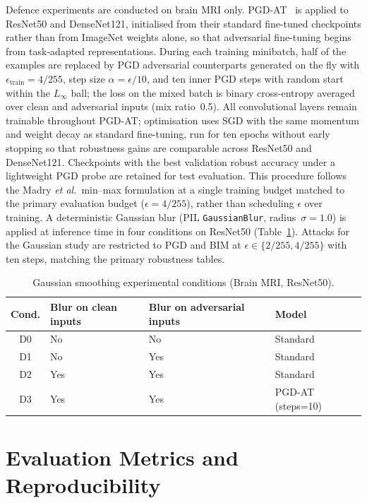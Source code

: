 \documentclass[12pt,a4paper,oneside]{report}
\begin{document}
Defence experiments are conducted on brain MRI only. PGD-AT~\cite{madry2018towards} is applied to ResNet50 and DenseNet121, initialised from their standard fine-tuned checkpoints rather than from ImageNet weights alone, so that adversarial fine-tuning begins from task-adapted representations. During each training minibatch, half of the examples are replaced by PGD adversarial counterparts generated on the fly with $\epsilon_{\mathrm{train}} = 4/255$, step size $\alpha = \epsilon/10$, and ten inner PGD steps with random start within the $L_\infty$ ball; the loss on the mixed batch is binary cross-entropy averaged over clean and adversarial inputs (mix ratio~0.5). All convolutional layers remain trainable throughout PGD-AT; optimisation uses SGD with the same momentum and weight decay as standard fine-tuning, run for ten epochs without early stopping so that robustness gains are comparable across ResNet50 and DenseNet121. Checkpoints with the best validation robust accuracy under a lightweight PGD probe are retained for test evaluation. This procedure follows the Madry \emph{et al.}\ min--max formulation at a single training budget matched to the primary evaluation budget ($\epsilon = 4/255$), rather than scheduling $\epsilon$ over training. A deterministic Gaussian blur (PIL \texttt{GaussianBlur}, radius~$\sigma = 1.0$) is applied at inference time in four conditions on ResNet50 (Table~\ref{tab:d0-d3}). Attacks for the Gaussian study are restricted to PGD and BIM at $\epsilon \in \{2/255, 4/255\}$ with ten steps, matching the primary robustness tables.

\begin{table}[htbp]
  \centering
  \caption{Gaussian smoothing experimental conditions (Brain MRI, ResNet50).}
  \label{tab:d0-d3}
  \begin{tabular}{clll}
    \toprule
    Cond. & Blur on clean inputs & Blur on adversarial inputs & Model \\
    \midrule
    D0 & No & No & Standard \\
    D1 & No & Yes & Standard \\
    D2 & Yes & Yes & Standard \\
    D3 & Yes & Yes & PGD-AT (steps=10) \\
    \bottomrule
  \end{tabular}
\end{table}

\section{Evaluation Metrics and Reproducibility}
\label{sec:methods-metrics}
\end{document}
